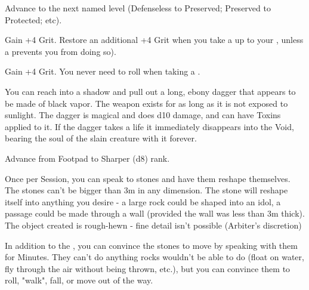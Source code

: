 \begin{multicols*}{2}

Advance   to the next named level (Defenseless to Preserved; Preserved to Protected; etc).


Gain +4 \MAX Grit. Restore an additional +4 Grit when you take a  up to your \MAX, unless a  prevents you from doing so).



Gain +4 \MAX Grit. You never need to roll  when taking a .


You can reach into a shadow and pull out a long, ebony dagger that appears to be made of black vapor. The weapon exists for as long as it is not exposed to sunlight.  The dagger is magical and does d10 damage, and can have Toxins applied to it.  If the dagger takes a life it immediately disappears into the Void, bearing the soul of the slain creature with it forever.


Advance  from Footpad to Sharper (d8) rank.

\cbreak


Once per Session, you can speak to stones and have them reshape themselves.  The stones can't be bigger than 3m in any dimension.  The stone will reshape itself into anything you desire - a large rock could be shaped into an idol, a passage could be made through a wall (provided the wall was less than 3m thick).  The object created is rough-hewn - fine detail isn't possible (Arbiter's discretion)



In addition to the , you can convince the stones to move by speaking with them for Minutes. They can't do anything rocks wouldn't be able to do (float on water, fly through the air without being thrown, etc.), but you can convince them to roll, "walk", fall, or move out of the way.


\end{multicols*}
